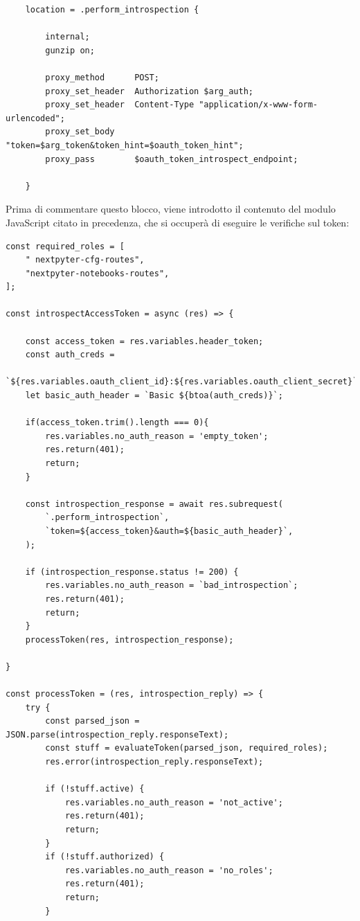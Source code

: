 \begin{verbatim}
    location = .perform_introspection {
       
        internal;
        gunzip on;

        proxy_method      POST;
        proxy_set_header  Authorization $arg_auth;
        proxy_set_header  Content-Type "application/x-www-form-urlencoded";
        proxy_set_body    "token=$arg_token&token_hint=$oauth_token_hint";
        proxy_pass        $oauth_token_introspect_endpoint;

    }

\end{verbatim}
Prima di commentare questo blocco, viene introdotto il contenuto del modulo JavaScript citato in precedenza, che si occuperà di eseguire le verifiche sul token:
\begin{verbatim}
const required_roles = [
    " nextpyter-cfg-routes",
    "nextpyter-notebooks-routes",
];

const introspectAccessToken = async (res) => {

    const access_token = res.variables.header_token;
    const auth_creds = 
        `${res.variables.oauth_client_id}:${res.variables.oauth_client_secret}`
    let basic_auth_header = `Basic ${btoa(auth_creds)}`;

    if(access_token.trim().length === 0){
        res.variables.no_auth_reason = 'empty_token';
        res.return(401);
        return;
    }

    const introspection_response = await res.subrequest(
        `.perform_introspection`,
        `token=${access_token}&auth=${basic_auth_header}`,
    );

    if (introspection_response.status != 200) {
        res.variables.no_auth_reason = `bad_introspection`;
        res.return(401);
        return;
    }
    processToken(res, introspection_response);

}

const processToken = (res, introspection_reply) => {
    try {
        const parsed_json = JSON.parse(introspection_reply.responseText);
        const stuff = evaluateToken(parsed_json, required_roles);
        res.error(introspection_reply.responseText);

        if (!stuff.active) {
            res.variables.no_auth_reason = 'not_active';
            res.return(401);
            return;
        }
        if (!stuff.authorized) {
            res.variables.no_auth_reason = 'no_roles';
            res.return(401);
            return;
        }


\end{verbatim}
